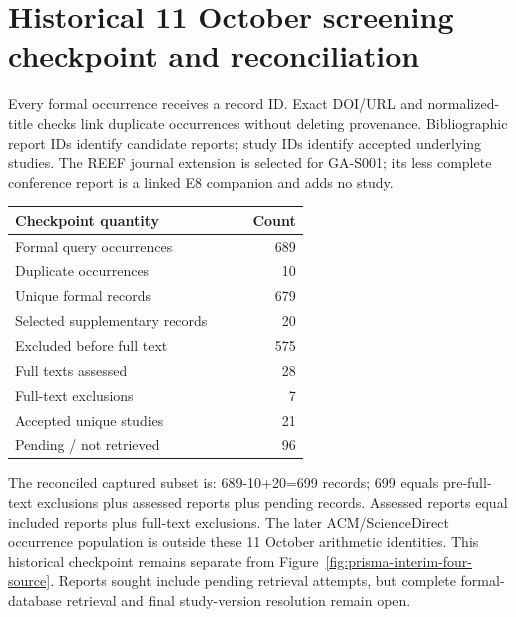 \documentclass[12pt,a4paper]{article}
\begin{document}
\section{Historical 11 October screening checkpoint and reconciliation}
Every formal occurrence receives a record ID. Exact DOI/URL and normalized-title checks link duplicate occurrences without deleting provenance. Bibliographic report IDs identify candidate reports; study IDs identify accepted underlying studies. The REEF journal extension is selected for GA-S001; its less complete conference report is a linked E8 companion and adds no study.
\begin{longtable}{P{0.7\linewidth}r}\toprule Checkpoint quantity & Count\\\midrule\endhead
Formal query occurrences & 689\\
Duplicate occurrences & 10\\
Unique formal records & 679\\
Selected supplementary records & 20\\
Excluded before full text & 575\\
Full texts assessed & 28\\
Full-text exclusions & 7\\
Accepted unique studies & 21\\
Pending / not retrieved & 96\\
\bottomrule\end{longtable}
The reconciled captured subset is: 689-10+20=699 records; 699 equals pre-full-text exclusions plus assessed reports plus pending records. Assessed reports equal included reports plus full-text exclusions. The later ACM/ScienceDirect occurrence population is outside these 11 October arithmetic identities. This historical checkpoint remains separate from Figure~\ref{fig:prisma-interim-four-source}. Reports sought include pending retrieval attempts, but complete formal-database retrieval and final study-version resolution remain open.
\end{document}
